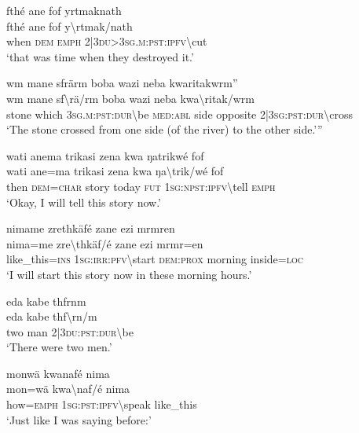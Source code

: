 \ea\label{ex:3:a7484}
fthé ane fof yrtmaknath\\
\gll fthé	ane	fof	y{\textbackslash}rtmak/nath\\
     when	\textsc{dem}	\textsc{emph}	2|3\textsc{du}>3\textsc{sg}.\textsc{m}:\textsc{pst}:\textsc{ipfv}{\textbackslash}cut\\
\glt `that was time when they destroyed it.'
\z

\ea\label{ex:3:a7485}
wm mane sfrärm boba wazi neba kwaritakwrm''\\
\gll wm	mane	sf{\textbackslash}rä/rm	boba	wazi	neba	kwa{\textbackslash}ritak/wrm\\
     stone	which	3\textsc{sg}.\textsc{m}:\textsc{pst}:\textsc{dur}{\textbackslash}be	\textsc{med}:\textsc{abl}	side	opposite	2|3\textsc{sg}:\textsc{pst}:\textsc{dur}{\textbackslash}cross\\
\glt `The stone crossed from one side (of the river) to the other side.'''
\z

\ea\label{ex:3:a7486}
wati anema trikasi zena kwa ŋatrikwé fof\\
\gll wati	ane=ma	trikasi	zena	kwa	ŋa{\textbackslash}trik/wé	fof\\
     then	\textsc{dem}=\textsc{char}	story	today	\textsc{fut}	1\textsc{sg}:\textsc{npst}:\textsc{ipfv}{\textbackslash}tell	\textsc{emph}\\
\glt `Okay, I will tell this story now.'
\z

\ea\label{ex:3:a7488}
nimame zrethkäfé zane ezi mrmren\\
\gll nima=me	zre{\textbackslash}thkäf/é	zane	ezi	mrmr=en\\
     like\_this=\textsc{ins}	1\textsc{sg}:\textsc{irr}:\textsc{pfv}{\textbackslash}start	\textsc{dem}:\textsc{prox}	morning	inside=\textsc{loc}\\
\glt `I will start this story now in these morning hours.'
\z

\ea\label{ex:3:a7489}
eda kabe thfrnm\\
\gll eda	kabe	thf{\textbackslash}rn/m\\
     two	man	2|3\textsc{du}:\textsc{pst}:\textsc{dur}{\textbackslash}be\\
\glt `There were two men.'
\z

\ea\label{ex:3:a7490}
monwä kwanafé nima\\
\gll mon=wä	kwa{\textbackslash}naf/é	nima\\
     how=\textsc{emph}	1\textsc{sg}:\textsc{pst}:\textsc{ipfv}{\textbackslash}speak	like\_this\\
\glt `Just like I was saying before:'
\z

